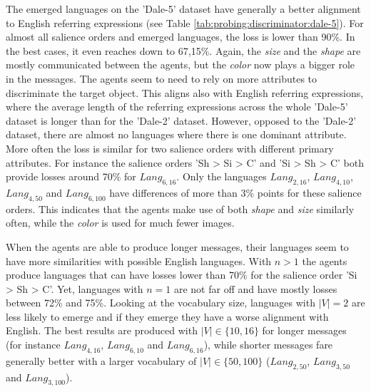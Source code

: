 The emerged languages on the 'Dale-5' dataset have generally a better alignment to English referring expressions (see Table \ref{tab:probing:discriminator:dale-5}).
For almost all salience orders and emerged languages, the loss is lower than 90\%.
In the best cases, it even reaches down to 67,15\%.
Again, the \emph{size} and the \emph{shape} are mostly communicated between the agents, but the \emph{color} now plays a bigger role in the messages.
The agents seem to need to rely on more attributes to discriminate the target object.
This aligns also with English referring expressions, where the average length of the referring expressions across the whole 'Dale-5' dataset is longer than for the 'Dale-2' dataset.
However, opposed to the 'Dale-2' dataset, there are almost no languages where there is one dominant attribute.
More often the loss is similar for two salience orders with different primary attributes.
For instance the salience orders 'Sh > Si > C' and 'Si > Sh > C' both provide losses around 70\% for $Lang_{6,16}$.
Only the languages $Lang_{2,16}$, $Lang_{4,10}$, $Lang_{4,50}$ and $Lang_{6,100}$ have differences of more than 3\% points for these salience orders.
This indicates that the agents make use of both \emph{shape} and \emph{size} similarly often, while the \emph{color} is used for much fewer images.

When the agents are able to produce longer messages, their languages seem to have more similarities with possible English languages.
With $n>1$ the agents produce languages that can have losses lower than 70\% for the salience order 'Si > Sh > C'.
Yet, languages with $n=1$ are not far off and have mostly losses between 72\% and 75\%.
Looking at the vocabulary size, languages with $|V|=2$ are less likely to emerge and if they emerge they have a worse alignment with English.
The best results are produced with $|V| \in \{10,16\}$ for longer messages (for instance $Lang_{4,16}$, $Lang_{6,10}$ and $Lang_{6,16}$), while shorter messages fare generally better with a larger vocabulary of $|V| \in \{50,100\}$ ($Lang_{2,50}$, $Lang_{3,50}$ and $Lang_{3,100}$).


